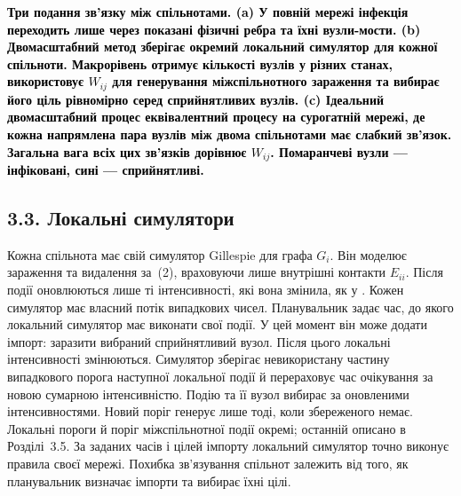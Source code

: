 ﻿\documentclass[11pt,a4paper]{article}
\begin{document}
\begin{minipage}{\linewidth}
\par\small\textbf{\textcolor{black}{Три подання зв'язку між спільнотами. (a) У повній мережі інфекція переходить лише через показані фізичні ребра та їхні вузли-мости. (b) Двомасштабний метод зберігає окремий локальний симулятор для кожної спільноти. Макрорівень отримує кількості вузлів у різних станах, використовує $W_{ij}$ для генерування міжспільнотного зараження та вибирає його ціль рівномірно серед сприйнятливих вузлів. (c) Ідеальний двомасштабний процес еквівалентний процесу на сурогатній мережі, де кожна напрямлена пара вузлів між двома спільнотами має слабкий зв'язок. Загальна вага всіх цих зв'язків дорівнює $W_{ij}$. Помаранчеві вузли --- інфіковані, сині --- сприйнятливі.}}

\end{minipage}\par
\subsection*{3.3. Локальні симулятори}
Кожна спільнота має свій симулятор Gillespie для графа $G_i$. Він моделює зараження та видалення за~(2), враховуючи лише внутрішні контакти $E_{ii}$. Після події оновлюються лише ті інтенсивності, які вона змінила, як у \citet{kuryliak2025simulating}. Кожен симулятор має власний потік випадкових чисел.
Планувальник задає час, до якого локальний симулятор має виконати свої події. У цей момент він може додати імпорт: заразити вибраний сприйнятливий вузол. Після цього локальні інтенсивності змінюються. Симулятор зберігає невикористану частину випадкового порога наступної локальної події й перераховує час очікування за новою сумарною інтенсивністю. Подію та її вузол вибирає за оновленими інтенсивностями. Новий поріг генерує лише тоді, коли збереженого немає. Локальні пороги й поріг міжспільнотної події окремі; останній описано в Розділі~3.5. За заданих часів і цілей імпорту локальний симулятор точно виконує правила своєї мережі. Похибка зв'язування спільнот залежить від того, як планувальник визначає імпорти та вибирає їхні цілі.
\end{document}
